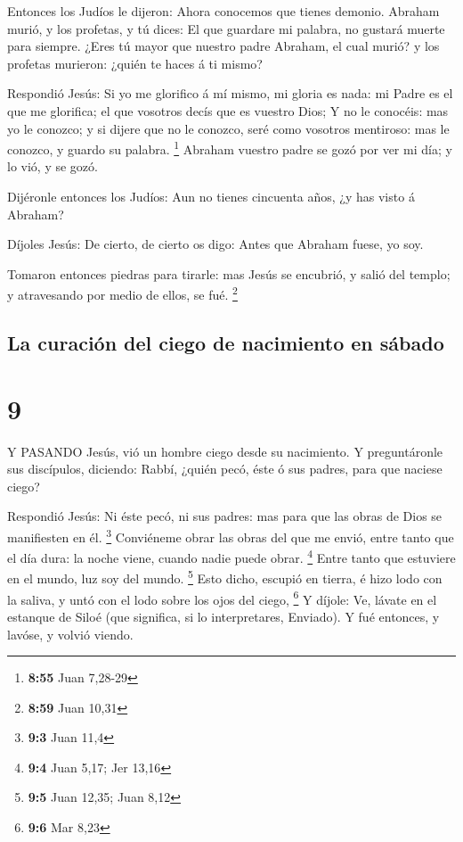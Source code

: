  Entonces los Judíos le dijeron: Ahora conocemos que tienes
demonio. Abraham murió, y los profetas, y tú dices: El que guardare mi
palabra, no gustará muerte para siempre.  ¿Eres tú mayor
que nuestro padre Abraham, el cual murió? y los profetas murieron:
¿quién te haces á ti mismo?

 Respondió Jesús: Si yo me glorifico á mí mismo, mi gloria
es nada: mi Padre es el que me glorifica; el que vosotros decís que es
vuestro Dios;  Y no le conocéis: mas yo le conozco; y si
dijere que no le conozco, seré como vosotros mentiroso: mas le conozco,
y guardo su palabra. \footnote{\textbf{8:55} Juan 7,28-29} 
Abraham vuestro padre se gozó por ver mi día; y lo vió, y se gozó.

 Dijéronle entonces los Judíos: Aun no tienes cincuenta
años, ¿y has visto á Abraham?

 Díjoles Jesús: De cierto, de cierto os digo: Antes que
Abraham fuese, yo soy.

 Tomaron entonces piedras para tirarle: mas Jesús se
encubrió, y salió del templo; y atravesando por medio de ellos, se fué.
\footnote{\textbf{8:59} Juan 10,31}

\hypertarget{la-curaciuxf3n-del-ciego-de-nacimiento-en-suxe1bado}{%
\subsection{La curación del ciego de nacimiento en
sábado}\label{la-curaciuxf3n-del-ciego-de-nacimiento-en-suxe1bado}}

\hypertarget{section-8}{%
\section{9}\label{section-8}}

 Y PASANDO Jesús, vió un hombre ciego desde su nacimiento.
 Y preguntáronle sus discípulos, diciendo: Rabbí, ¿quién
pecó, éste ó sus padres, para que naciese ciego?

 Respondió Jesús: Ni éste pecó, ni sus padres: mas para que
las obras de Dios se manifiesten en él. \footnote{\textbf{9:3} Juan 11,4}
 Conviéneme obrar las obras del que me envió, entre tanto
que el día dura: la noche viene, cuando nadie puede obrar. \footnote{\textbf{9:4}
  Juan 5,17; Jer 13,16}  Entre tanto que estuviere en el
mundo, luz soy del mundo. \footnote{\textbf{9:5} Juan 12,35; Juan 8,12}
 Esto dicho, escupió en tierra, é hizo lodo con la saliva, y
untó con el lodo sobre los ojos del ciego, \footnote{\textbf{9:6} Mar
  8,23}  Y díjole: Ve, lávate en el estanque de Siloé (que
significa, si lo interpretares, Enviado). Y fué entonces, y lavóse, y
volvió viendo.

